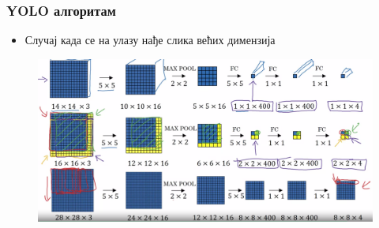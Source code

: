 \begin{frame}
\frametitle{YOLO алгоритам}
\begin{itemize}
 \item Случај када се на улазу нађе \alert{слика већих димензија}
\end{itemize}
\begin{figure}[H]
  \centering
      \includegraphics[scale=0.22]{slike/ngSlidWConv2.png}
\end{figure}
\end{frame}


